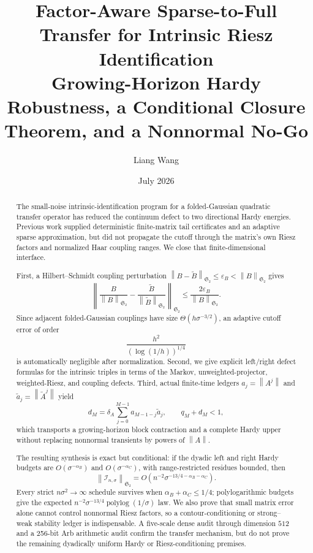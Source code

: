 \documentclass[11pt]{article}
\title{Factor-Aware Sparse-to-Full Transfer for Intrinsic Riesz Identification\\
\large Growing-Horizon Hardy Robustness, a Conditional Closure Theorem,
and a Nonnormal No-Go}
\author{Liang Wang}
\date{July 2026}
\theoremstyle{definition}
\theoremstyle{remark}
\newcommand{\HS}{\mathfrak S_2}
\newcommand{\cI}{\mathcal I}
\newcommand{\norm}[1]{\left\lVert #1\right\rVert}
\begin{document}
\maketitle

\begin{abstract}
The small-noise intrinsic-identification program for a folded-Gaussian
quadratic transfer operator has reduced the continuum defect to two
directional Hardy energies.  Previous work supplied deterministic
finite-matrix tail certificates and an adaptive sparse approximation, but
did not propagate the cutoff through the matrix's own Riesz factors and
normalized Haar coupling ranges.  We close that finite-dimensional
interface.

First, a Hilbert--Schmidt coupling perturbation
$\norm{B-\widetilde B}_{\HS}\le\varepsilon_B<\norm B_{\HS}$ gives
\[
 \left\|
 \frac B{\norm B_{\HS}}-
 \frac{\widetilde B}{\norm{\widetilde B}_{\HS}}
 \right\|_{\HS}
 \le\frac{2\varepsilon_B}{\norm B_{\HS}}.
\]
Since adjacent folded-Gaussian couplings have size
$\Theta(h\sigma^{-3/2})$, an adaptive cutoff error of order
\[
 \frac{h^2}{(\log(1/h))^{1/4}}
\]
is automatically negligible after normalization.  Second, we give explicit
left/right defect formulas for the
intrinsic triples in terms of the Markov, unweighted-projector,
weighted-Riesz, and coupling defects.  Third, actual finite-time ledgers
$a_j=\norm{A^j}$ and $\widetilde a_j=\norm{\widetilde A^j}$ yield
\[
 d_M=\delta_A\sum_{j=0}^{M-1}a_{M-1-j}\widetilde a_j,
 \qquad q_M+d_M<1,
\]
which transports a growing-horizon block contraction and a complete Hardy
upper without replacing nonnormal transients by powers of $\norm A$.

The resulting synthesis is exact but conditional: if the dyadic left and
right Hardy budgets are $O(\sigma^{-\alpha_B})$ and
$O(\sigma^{-\alpha_C})$, with range-restricted residues bounded, then
\[
 \norm{\cI_{n,\sigma}}_{\HS}
 =O\!\left(n^{-2}\sigma^{-13/4-\alpha_B-\alpha_C}\right).
\]
Every strict $n\sigma^2\to\infty$ schedule survives when
$\alpha_B+\alpha_C\le1/4$; polylogarithmic budgets give the expected
$n^{-2}\sigma^{-13/4}\operatorname{polylog}(1/\sigma)$ law.  We also prove
that small matrix error alone cannot control nonnormal Riesz factors, so a
contour-conditioning or strong--weak stability ledger is indispensable.
A five-scale dense audit through dimension $512$ and a 256-bit Arb
arithmetic audit confirm the transfer mechanism, but do not prove the
remaining dyadically uniform Hardy or Riesz-conditioning premises.
\end{abstract}
\end{document}
